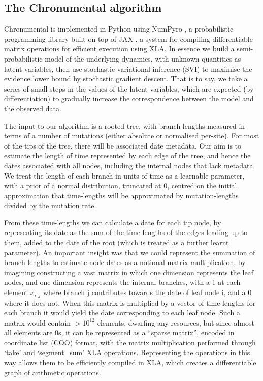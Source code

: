 \subsection*{The Chronumental algorithm}

Chronumental is implemented in Python using NumPyro \citep{phan2019composable}, a probabilistic programming library built on top of JAX \citep{jax2018github}, a system for compiling differentiable matrix operations for efficient execution using XLA. In essence we build a semi-probabilistic model of the underlying dynamics, with unknown quantities as latent variables, then use stochastic variational inference (SVI) to maximise the evidence lower bound by stochastic gradient descent. That is to say, we take a series of small steps in the values of the latent variables, which are expected (by differentiation) to gradually increase the correspondence between the model and the observed data.

The input to our algorithm is a rooted tree, with branch lengths measured in terms of a number of mutations (either absolute or normalised per-site). For most of the tips of the tree, there will be associated date metadata. Our aim is to estimate the length of time represented by each edge of the tree, and hence the dates associated with all nodes, including the internal nodes that lack metadata. We treat the length of each branch in units of time as a learnable parameter, with a prior of a normal distribution, truncated at 0, centred on the initial approximation that time-lengths will be approximated by mutation-lengths divided by the mutation rate. 

From these time-lengths we can calculate a date for each tip node, by representing its date as the sum of the time-lengths of the edges leading up to them, added to the date of the root (which is treated as a further learnt parameter). An important insight was that we could represent the summation of branch lengths to estimate node dates as a notional matrix multiplication, by imagining constructing a vast matrix in which one dimension represents the leaf nodes, and one dimension represents the internal branches, with a 1 at each element $x_{i,j}$ where branch j contributes towards the date of leaf node i, and a 0 where it does not. When this matrix is multiplied by a vector of time-lengths for each branch it would yield the date corresponding to each leaf node.  Such a matrix would contain $>10^{12}$ elements, dwarfing any resources, but since almost all elements are 0s, it can be represented as a ``sparse matrix'', encoded in coordinate list (COO) format, with the matrix multiplication performed through `take' and `segment\_sum' XLA operations. Representing the operations in this way allows them to be efficiently compiled in XLA, which creates a differentiable graph of arithmetic operations. 


